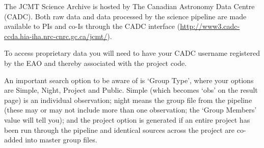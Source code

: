 The JCMT Science Archive is hosted by The Canadian Astronomy Data
Centre (CADC). Both raw data and data processed by the science
pipeline are made available to PIs and co-Is through the CADC
interface (\url{http://www3.cadc-ccda.hia-iha.nrc-cnrc.gc.ca/jcmt/}).

To access proprietary data you will need to have your CADC username
registered by the EAO and thereby associated with the project code.

An important search option to be aware of is `Group Type', where your
options are Simple, Night, Project and Public. Simple (which becomes
`obs' on the result page) is an individual observation; night means
the group file from the pipeline (these may or may not include more
than one observation; the `Group Members' value will tell you); and
the project option is generated if an entire project has been run
through the pipeline and identical sources across the project are
co-added into master group files.


